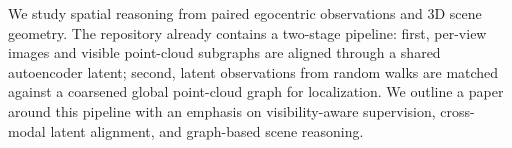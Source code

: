 We study spatial reasoning from paired egocentric observations and 3D scene geometry. The repository already contains a two-stage pipeline: first, per-view images and visible point-cloud subgraphs are aligned through a shared autoencoder latent; second, latent observations from random walks are matched against a coarsened global point-cloud graph for localization. We outline a paper around this pipeline with an emphasis on visibility-aware supervision, cross-modal latent alignment, and graph-based scene reasoning.

